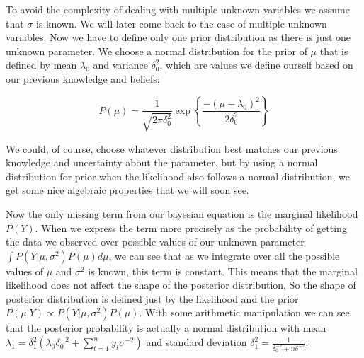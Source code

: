 \documentclass[12pt,a4paper,leqno]{report}
\theoremstyle{plain}
\theoremstyle{definition}
\theoremstyle{remark}
\begin{document}
To avoid the complexity of dealing with multiple unknown variables we assume
that \(\sigma \) is known. We will later come back to the case of multiple
unknown variables. Now we have to define only one prior distribution as there is
just one unknown parameter. We choose a normal distribution for the prior of
\(\mu \) that is defined by mean \(\lambda_0 \) and variance \(\delta_0^2 \),
which are values we define ourself based on our previous knowledge and beliefs:

\begin{def}\label{}
    \begin{equation}\label{}
        P(\mu)
        =
        \frac{1}
        {{\sqrt {2\pi \delta_0^2} }}
        \exp{ \left \{\frac{-(\mu-\lambda_0)^2} {2\delta_0^2} \right \} }
    \end{equation}
\end{def}

We could, of course, choose whatever distribution best matches our previous
knowledge and uncertainty about the parameter, but by using a normal distribution
for prior when the likelihood also follows a normal distribution, we get some
nice algebraic properties that we will soon see.

Now the only missing term from our bayesian equation is the marginal likelihood
\(P(Y) \). When we express the term more precisely as the probability of getting
the data we observed over possible values of our unknown parameter \(\int
P(Y|\mu,\sigma^2)P(\mu) d\mu \), we can see that as we integrate over all the possible
values of \(\mu \) and \(\sigma^2\) is known, this term is constant. This means that the marginal likelihood does
not affect the shape of the posterior distribution, So the shape of posterior
distribution is defined just by the likelihood and the prior \(P(\mu|Y)
\propto P(Y|\mu, \sigma^2)P(\mu) \). With some arithmetic manipulation we can
see that the posterior probability is actually a normal distribution with mean
\(\lambda_1 = \delta_1^2 \left( \lambda_0 \delta_0^{-2} + \sum_{t=1}^{n} y_t \sigma^{-2}
\right) \) and standard deviation \(\delta_1^2 =
\frac{1}{\delta_0^{-2}+n\delta^{-2}} \):
\end{document}
